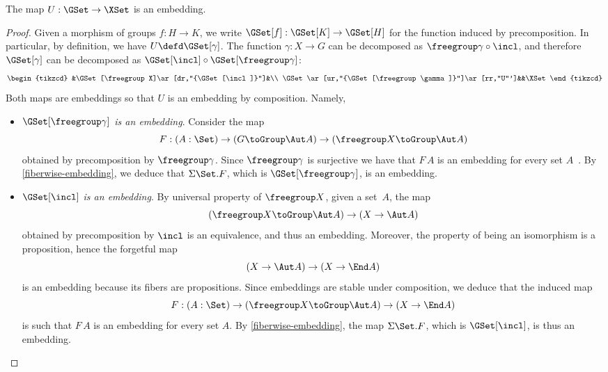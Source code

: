\begin{proposition}
  The map $U:\GSet\to\XSet$ is an embedding.
\end{proposition}
\begin{proof}
Given a morphism of groups $f:H\to K$, we write $\GSet[f]:\GSet[K]\to\GSet[H]$
for the function induced by precomposition. In particular, by definition, we
have $U\defd\GSet[\gamma]$. The function $\gamma:X\to G$ can be decomposed as
$\freegroup\gamma\circ\incl$, and therefore $\GSet[\gamma]$ can be decomposed as
$\GSet[\incl]\circ\GSet[\freegroup\gamma]$:
\[
  \begin{tikzcd}
    &\GSet[\freegroup X]\ar[dr,"{\GSet[\incl]}"]&\\
    \GSet\ar[ur,"{\GSet[\freegroup\gamma]}"]\ar[rr,"U"']&&\XSet
  \end{tikzcd}
\]
Both maps are embeddings so that $U$ is an embedding by composition. Namely,
\begin{itemize}
\item \emph{$\GSet[\freegroup\gamma]$ is an embedding}. Consider the map
  \[
    F:(A:\Set)\to(G\toGroup\Aut A)\to(\freegroup X\toGroup\Aut A)
  \]
  obtained by precomposition by $\freegroup\gamma$. Since $\freegroup\gamma$ is
  surjective we have that $F\,A$ is an
  embedding for every set $A$~\cite[Lemma~10.1.4]{hottbook}. By \cref{fiberwise-embedding}, we
  deduce that $\Sigma\Set.F$, which is $\GSet[\freegroup\gamma]$, is an
  embedding.
\item \emph{$\GSet[\incl]$ is an embedding}. By universal property of $\freegroup X$, given a set~$A$, the map
  \[
    (\freegroup X\toGroup\Aut A)\to(X\to\Aut A)
  \]
  obtained by precomposition by $\incl$ is an equivalence, and thus an
  embedding. Moreover, the property of being an isomorphism is a proposition, hence the forgetful map
  \[
    (X\to\Aut A)\to(X\to\End A)
  \]
  is an embedding because its fibers are propositions. Since embeddings are
  stable under composition, we deduce that the induced map
  \[
    F:(A:\Set)\to(\freegroup X\toGroup\Aut A)\to(X\to\End A)
  \]
  is such that $F\,A$ is an embedding for every set $A$. By
  \cref{fiberwise-embedding}, the map $\Sigma\Set.F$, which is $\GSet[\incl]$, is
  thus an embedding.\qedhere
\end{itemize}  
\end{proof}

